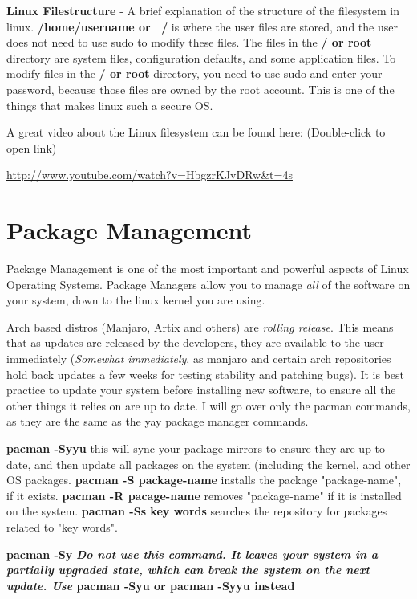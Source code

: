 \documentclass[12pt, letterpaper, twoside]{article}
\begin{document}
\textbf{Linux Filestructure} - A brief explanation of the structure of the filesystem in linux. \textbf{/home/username or ~/} is where the user files are stored, and the user does not need to use sudo to modify these files. The files in the \textbf{/ or root} directory are system files, configuration defaults, and some application files. To modify files in the \textbf{/ or root} directory, you need to use sudo and enter your password, because those files are owned by the root account. This is one of the things that makes linux such a secure OS.

A great video about the Linux filesystem can be found here: 
(Double-click to open link)

\url{http://www.youtube.com/watch?v=HbgzrKJvDRw&t=4s}

\section{Package Management}

Package Management is one of the most important and powerful aspects of Linux Operating Systems. Package Managers allow you to manage \textit{all} of the software on your system, down to the linux kernel you are using. 

Arch based distros (Manjaro, Artix and others) are \textit{rolling release}. This means that as updates are released by the developers, they are available to the user immediately (\textit{Somewhat immediately}, as manjaro and certain arch repositories hold back updates a few weeks for testing stability and patching bugs). It is best practice to update your system before installing new software, to ensure all the other things it relies on are up to date. I will go over only the pacman commands, as they are the same as the yay package manager commands.

\textbf{pacman -Syyu} this will sync your package mirrors to ensure they are up to date, and then update all packages on the system (including the kernel, and other OS packages. \textbf{pacman -S package-name} installs the package "package-name", if it exists. \textbf{pacman -R pacage-name} removes "package-name" if it is installed on the system. \textbf{pacman -Ss key words} searches the repository for packages related to "key words".

\textbf{pacman -Sy} \textbf{\textit{Do not use this command. It leaves your system in a partially upgraded state, which can break the system on the next update. Use }pacman -Syu or pacman -Syyu instead}
\end{document}
